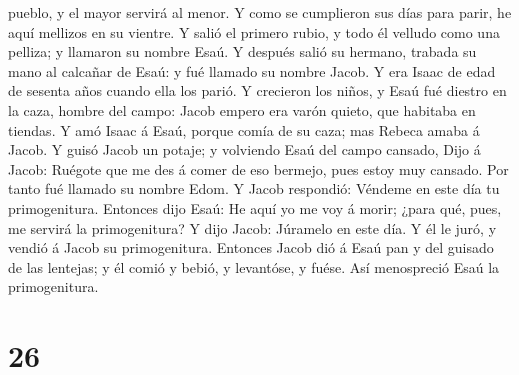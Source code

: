 pueblo, y el mayor servirá al menor.  Y como se cumplieron
sus días para parir, he aquí mellizos en su vientre.  Y
salió el primero rubio, y todo él velludo como una pelliza; y llamaron
su nombre Esaú.  Y después salió su hermano, trabada su
mano al calcañar de Esaú: y fué llamado su nombre Jacob. Y era Isaac de
edad de sesenta años cuando ella los parió.  Y crecieron
los niños, y Esaú fué diestro en la caza, hombre del campo: Jacob empero
era varón quieto, que habitaba en tiendas.  Y amó Isaac á
Esaú, porque comía de su caza; mas Rebeca amaba á Jacob.  Y
guisó Jacob un potaje; y volviendo Esaú del campo cansado, 
Dijo á Jacob: Ruégote que me des á comer de eso bermejo, pues estoy muy
cansado. Por tanto fué llamado su nombre Edom.  Y Jacob
respondió: Véndeme en este día tu primogenitura.  Entonces
dijo Esaú: He aquí yo me voy á morir; ¿para qué, pues, me servirá la
primogenitura?  Y dijo Jacob: Júramelo en este día. Y él le
juró, y vendió á Jacob su primogenitura.  Entonces Jacob
dió á Esaú pan y del guisado de las lentejas; y él comió y bebió, y
levantóse, y fuése. Así menospreció Esaú la primogenitura.

\hypertarget{section-25}{%
\section{26}\label{section-25}}

